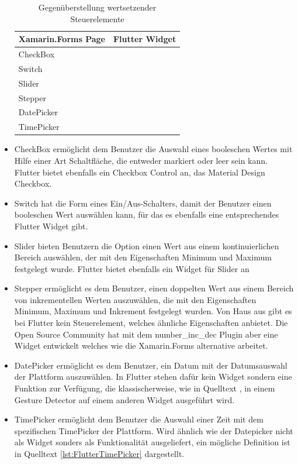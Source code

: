 \begin{itemize}

\begin{table}[!ht]
\begin{tabularx}{\textwidth}{X|X}
   \textbf{Xamarin.Forms Page} & \textbf{Flutter Widget}  \\
\hline
	CheckBox		       				&  	 		\\ 
	Switch		       					&  	 		\\ 
	Slider		       					&  	 		\\ 
	Stepper		       				&  	 		\\ 
	DatePicker		       			&  			\\ 
	TimePicker		       			&  	 		\\ 
\end{tabularx}
\caption{Gegenüberstellung wertsetzender Steuerelemente}
 \label{tab:eventcommands}
\end{table}

\setlength\itemsep{-0.6em}
 \item CheckBox ermöglicht dem Benutzer die Auswahl eines booleschen Wertes mit Hilfe einer Art Schaltfläche, die entweder markiert oder leer sein kann. Flutter bietet ebenfalls ein Checkbox Control an,  das Material Design Checkbox. 
  \item Switch hat die Form eines Ein/Aus-Schalters, damit der Benutzer einen booleschen Wert auswählen kann, für das es ebenfalls eine entsprechendes Flutter Widget gibt. 
 \item Slider bieten Benutzern die Option einen  Wert aus einem kontinuierlichen Bereich auswählen, der mit den Eigenschaften Minimum und Maximum festgelegt wurde.  Flutter bietet ebenfalls ein Widget für Slider an
 \item Stepper ermöglicht es dem Benutzer, einen doppelten Wert aus einem Bereich von inkrementellen Werten auszuwählen, die mit den Eigenschaften Minimum, Maximum und Inkrement festgelegt wurden.  Von Haus aus gibt es bei Flutter kein Steuerelement,  welches ähnliche Eigenschaften anbietet.  Die Open Source Community hat mit dem number\_inc\_dec Plugin aber eine Widget entwickelt welches wie die Xamarin.Forms alternative arbeitet. 
 \item DatePicker ermöglicht es dem Benutzer, ein Datum mit der Datumsauswahl der Plattform auszuwählen.  In Flutter stehen dafür kein Widget sondern eine Funktion zur Verfügung,  die klassischerweise, wie in Quelltext , in einem Gesture Detector auf einem anderen Widget ausgeführt wird.  
 \item TimePicker ermöglicht dem Benutzer die Auswahl einer Zeit mit dem spezifischen TimePicker der Plattform.  Wird ähnlich wie der Datepicker nicht als Widget sonders als Funktionalität ausgeliefert,  ein mögliche Definition ist in Quelltext \ref{lst:FlutterTimePicker} dargestellt.
 
 \begin{minipage}{\linewidth}

\end{minipage}

\end{itemize}

